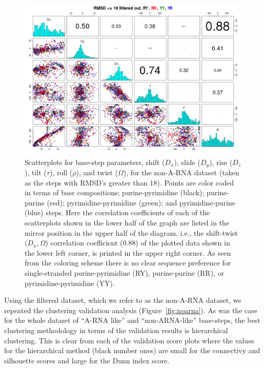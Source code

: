 \begin{figure}
\centering
\includegraphics[angle=90, scale=0.48]{Chapter2/noarna_step.png}
\caption{Scatterplots for base-step parameters, shift ($D_{x}$), slide
($D_{y}$),  rise ($D_{z}$),  tilt ($\tau$),  roll ($\rho$),  and twist
($\Omega$), for the non-A-RNA dataset  (taken as the steps with RMSD's
greater  than  18).    Points  are  color  coded  in   terms  of  base
compositions;   purine-pyrimidine    (black);   purine-purine   (red);
pyrimidine-pyrimidine    (green);    and   pyrimidine-purine    (blue)
steps. Here  the correlation coefficients of each  of the scatterplots
shown in the lower half of the graph are listed in the mirror position
in  the upper  half of  the  diagram, i.e.,  the shift-twist  ($D_{x},
\Omega$) correlation  coefficient (0.88) of the plotted  data shown in
the lower left corner, is printed  in the upper right corner.  As seen
from the  coloring scheme  there is no  clear sequence  preference for
single-stranded   purine-pyrimidine  (RY),   purine-purine   (RR),  or
pyrimidine-pyrimidine (YY).}
\label{fig:pairsnoarna}
\end{figure}

Using  the  filtered dataset,  which  we  refer  to as  the  non-A-RNA
dataset,    we   repeated    the   clustering    validation   analysis
(Figure~\ref{fig:noarna}).  As  was the case for the  whole dataset of
``A-RNA like''  and ``non-ARNA-like'' base-steps,  the best clustering
methodology  in  terms  of  the  validation  results  is  hierarchical
clustering.  This is  clear from  each of  the validation  score plots
where the values  for the hierarchical method (black  number ones) are
small for the connectivy and  silhouette scores and large for the Dunn
index score.

